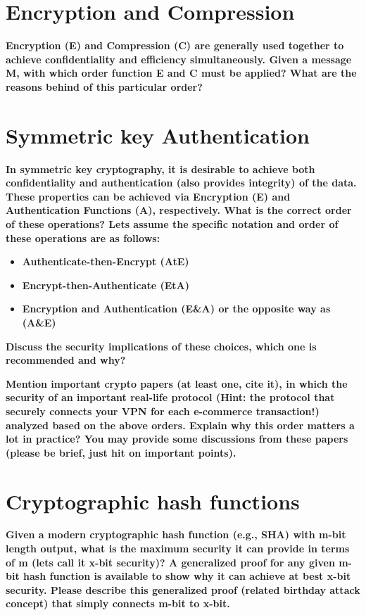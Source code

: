 \documentclass[letterpaper,11pt,notitlepage,fleqn]{article}
\begin{document}
\section{Encryption and Compression}
\noindent \textbf{Encryption (E) and Compression (C) are generally used together to achieve confidentiality and  efficiency  simultaneously. Given  a message M, with which order  function E  and C must be applied? What are the reasons behind of this particular order?}

\section{Symmetric key Authentication}
\noindent \textbf{In  symmetric  key  cryptography,  it  is  desirable  to  achieve  both  confidentiality  and authentication  (also  provides  integrity)  of  the  data.  These  properties  can  be  achieved  via Encryption (E) and Authentication Functions (A), respectively. What is the correct order of these operations? Lets assume the specific notation and order of these operations are as follows:} 
\begin{itemize}
    \item \textbf{Authenticate-then-Encrypt (AtE)}
    \item \textbf{Encrypt-then-Authenticate (EtA)}
    \item \textbf{Encryption and Authentication (E\&A) or the opposite way as (A\&E)}
\end{itemize}

\noindent \textbf{Discuss the security implications of these choices, which one is recommended and why?}

\noindent \textbf{Mention important crypto papers (at least one, cite it), in which the security of an important real-life  protocol  (Hint:  the  protocol  that  securely  connects  your  VPN  for  each  e-commerce transaction!)  analyzed  based  on  the  above  orders.  Explain  why  this  order  matters  a  lot  in practice?  You  may  provide  some  discussions  from  these  papers  (please  be  brief,  just  hit  on important points).}

\section{Cryptographic  hash  functions}
\noindent \textbf{Given  a modern  cryptographic  hash  function  (e.g.,  SHA) with m-bit  length  output, what is  the maximum  security  it  can  provide  in  terms  of  m  (lets  call  it  x-bit  security)? A  generalized proof  for  any  given  m-bit  hash  function  is  available  to  show  why  it  can  achieve  at  best  x-bit security.  Please  describe  this  generalized  proof  (related  birthday  attack  concept)  that  simply connects m-bit to x-bit.}
\end{document}
